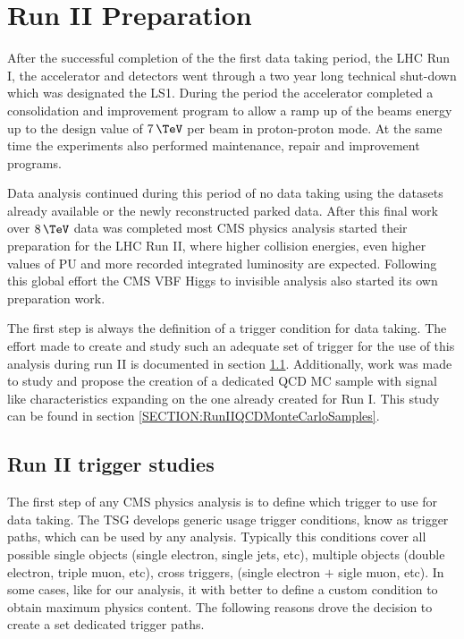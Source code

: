 \chapter{Run II Preparation}
\label{CHAPTER:RunIIPreparation}

\glsresetall %

After the successful completion of the the first data taking period, the \gls{LHC} Run I, the accelerator and detectors went through a two year long technical shut-down which was designated the \gls{LS1}. During the period the accelerator completed a consolidation and improvement program to allow a ramp up of the beams energy up to the design value of $7\,\TeV$ per beam in proton-proton mode. At the same time the experiments also performed maintenance, repair and improvement programs. 

Data analysis continued during this period of no data taking using the datasets already available or the newly reconstructed parked data. After this final work over $8\,\TeV$ data was completed most \gls{CMS} physics analysis started their preparation for the \gls{LHC} Run II, where higher collision energies, even higher values of \gls{PU} and more recorded integrated luminosity are expected. Following this global effort the \gls{CMS} \gls{VBF} Higgs to invisible analysis also started its own preparation work. 

The first step is always the definition of a trigger condition for data taking. The effort made to create and study such an adequate set of trigger for the use of this analysis during run II is documented in section \ref{SECTION:RunIITriggerStudies}. Additionally, work was made to study and propose the creation of a dedicated \gls{QCD} \gls{MC} sample with signal like characteristics expanding on the one already created for Run I. This study can be found in section \ref{SECTION:RunIIQCDMonteCarloSamples}.

\section{Run II trigger studies}
\label{SECTION:RunIITriggerStudies}

The first step of any \gls{CMS} physics analysis is to define which trigger to use for data taking. The \gls{TSG} develops generic usage trigger conditions, know as trigger paths, which can be used by any analysis. Typically this conditions cover all possible single objects (single electron, single jets, etc), multiple objects (double electron, triple muon, etc), cross triggers, (single electron $+$ sigle muon, etc). In some cases, like for our analysis, it with better to define a custom condition to obtain maximum physics content. The following reasons drove the decision to create a set dedicated trigger paths.

